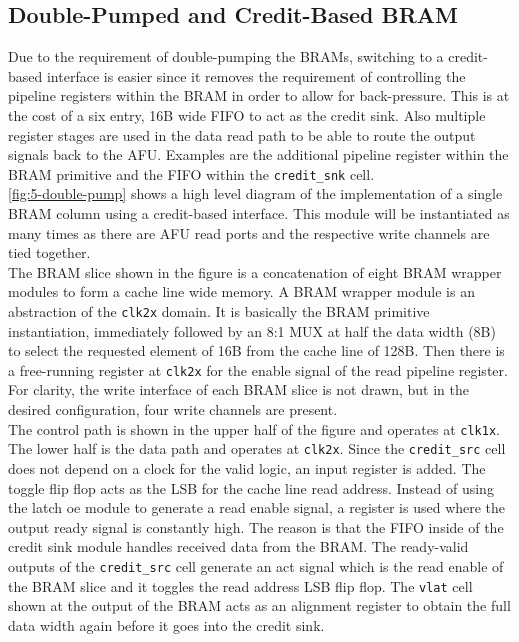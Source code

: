 \subsection{Double-Pumped and Credit-Based BRAM}
Due to the requirement of double-pumping the BRAMs, switching to a credit-based interface is easier since it removes the requirement of controlling the pipeline registers within the BRAM in order to allow for back-pressure. This is at the cost of a six entry, 16B wide FIFO to act as the credit sink. Also multiple register stages are used in the data read path to be able to route the output signals back to the AFU. Examples are the additional pipeline register within the BRAM primitive and the FIFO within the \texttt{credit\_snk} cell.\\
\autoref{fig:5-double-pump} shows a high level diagram of the implementation of a single BRAM column using a credit-based interface. This module will be instantiated as many times as there are AFU read ports and the respective write channels are tied together.\\
The BRAM slice shown in the figure is a concatenation of eight BRAM wrapper modules to form a cache line wide memory. A BRAM wrapper module is an abstraction of the \texttt{clk2x} domain. It is basically the BRAM primitive instantiation, immediately followed by an 8:1 MUX at half the data width (8B) to select the requested element of 16B from the cache line of 128B. Then there is a free-running register at \texttt{clk2x} for the enable signal of the read pipeline register. For clarity, the write interface of each BRAM slice is not drawn, but in the desired configuration, four write channels are present.\\
The control path is shown in the upper half of the figure and operates at \texttt{clk1x}. The lower half is the data path and operates at \texttt{clk2x}. Since the \texttt{credit\_src} cell does not depend on a clock for the valid logic, an input register is added. The toggle flip flop acts as the LSB for the cache line read address. Instead of using the latch oe module to generate a read enable signal, a register is used where the output ready signal is constantly high. The reason is that the FIFO inside of the credit sink module handles received data from the BRAM. The ready-valid outputs of the \texttt{credit\_src} cell generate an act signal which is the read enable of the BRAM slice and it toggles the read address LSB flip flop. The \texttt{vlat} cell shown at the output of the BRAM acts as an alignment register to obtain the full data width again before it goes into the credit sink.

